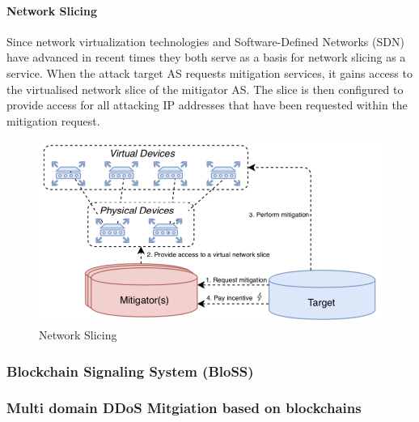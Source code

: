 \paragraph{Network Slicing}
Since network virtualization technologies and Software-Defined Networks (SDN) have advanced in recent times they both serve as a basis for network slicing as a service. When the attack target AS requests mitigation services, it gains access to the virtualised network slice of the mitigator AS. The slice is then configured to provide access for all attacking IP addresses that have been requested within the mitigation request.
\begin{figure}[ht]
  \begin{center}
  \includegraphics[scale=0.5]{Talk7/img/ddos/cooperative_network_network_slicing}
  \end{center}
  \caption{Network Slicing}
  \label{ddos_network_slicing}
\end{figure}


\subsubsection{Blockchain Signaling System (BloSS)}

\subsubsection{Multi domain DDoS Mitgiation based on blockchains}
